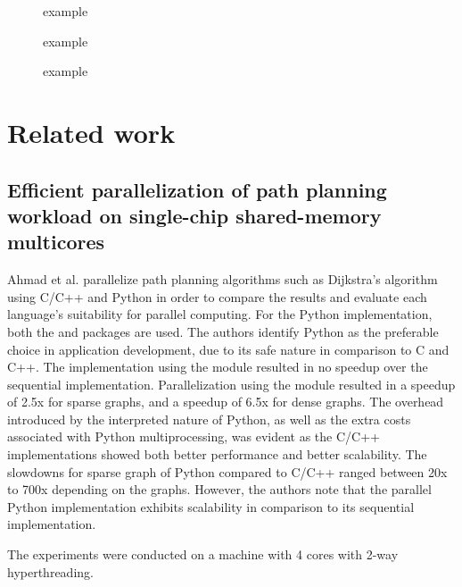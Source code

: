 \begin{figure}[ht]
  \centering
  \caption{ example}
  \label{fig:code_pipe_example}
\end{figure}

\begin{figure}[ht]
  \centering
  \caption{ example}
  \label{fig:code_queue_example}
\end{figure}

\begin{figure}[ht]
  \centering
  \caption{ example}
  \label{fig:code_pool_example}
\end{figure}

\section{Related work}
\subsection{Efficient parallelization of path planning workload on single-chip shared-memory multicores}
Ahmad et al. \cite{ahmad_2015_efficient_epoppwossm} parallelize path planning algorithms such as Dijkstra's algorithm using C/C++ and
Python in order to compare the results and evaluate each language's suitability for parallel computing. For the Python implementation,
both the  and  packages are used. The authors identify Python as the preferable choice 
in application development, due to its safe nature in comparison to C and C++. The implementation using the 
module resulted in no speedup over the sequential implementation. Parallelization using the  module resulted
in a speedup of 2.5x for sparse graphs, and a speedup of 6.5x for dense graphs. The overhead introduced by the interpreted nature
of Python, as well as the extra costs associated with Python multiprocessing, was evident as the C/C++ implementations showed both
better performance and better scalability. The slowdowns for sparse graph of Python compared to C/C++ ranged between
20x to 700x depending on the graphs.
However, the authors note that the parallel Python implementation exhibits scalability in comparison to its sequential implementation.

The experiments were conducted on a machine with 4 cores with 2-way hyperthreading.


